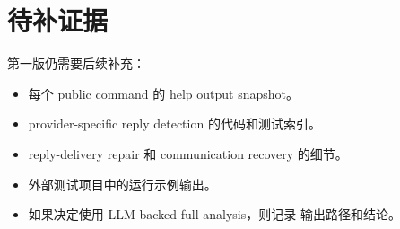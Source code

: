 \section{待补证据}

第一版仍需要后续补充：

\begin{itemize}
  \item 每个 public command 的 help output snapshot。
  \item provider-specific reply detection 的代码和测试索引。
  \item reply-delivery repair 和 communication recovery 的细节。
  \item 外部测试项目中的运行示例输出。
  \item 如果决定使用 LLM-backed full analysis，则记录  输出路径和结论。
\end{itemize}
